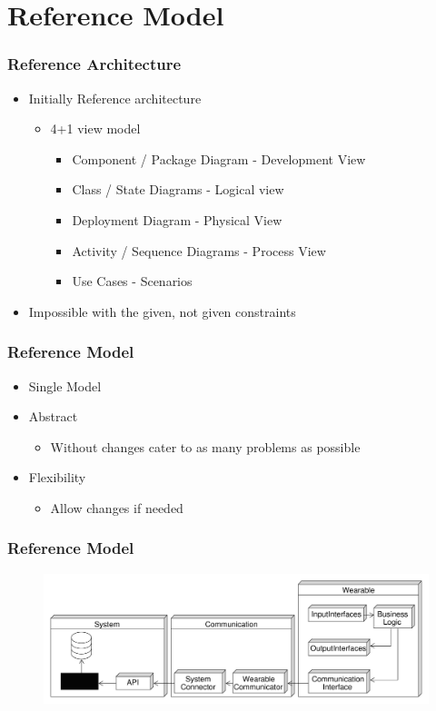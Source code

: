 \section{Reference Model}
\begin{frame}\frametitle{Reference Architecture}
	\begin{itemize}
		\item Initially Reference architecture
		\begin{itemize}
			\item 4+1 view model
			\begin{itemize}
				\item Component / Package Diagram - Development View
				\item Class / State Diagrams - Logical view
				\item Deployment Diagram - Physical View
				\item Activity / Sequence Diagrams - Process View
				\item Use Cases - Scenarios
			\end{itemize}
		\end{itemize}
	\end{itemize}
	\begin{itemize}
		\item<2> Impossible with the given, not given constraints
	\end{itemize}
\end{frame}
\begin{frame}\frametitle{Reference Model}
	\begin{itemize}
		\item Single Model
	\end{itemize}
	\begin{itemize}
		\item Abstract
		\begin{itemize}
			\item Without changes cater to as many problems as possible
		\end{itemize}
		\item Flexibility
		\begin{itemize}
		\item Allow changes if needed
	
		\end{itemize}
	\end{itemize}
\end{frame}
\begin{frame}\frametitle{Reference Model}
	\begin{figure}
		\includegraphics[width=\textwidth]{images/ReferenceModel}
	\end{figure}
\end{frame}

